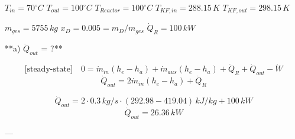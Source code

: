 \( T_{in} = 70^\circ C \)  
\( T_{out} = 100^\circ C \)  
\( T_{Reactor} = 100^\circ C \)  
\( T_{KF,in} = 288.15 \, K \)  
\( T_{KF,out} = 298.15 \, K \)  

\( m_{ges} = 5755 \, kg \)  
\( x_D = 0.005 = m_D / m_{ges} \)  
\( \dot{Q}_R = 100 \, kW \)  

**a) \( \dot{Q}_{out} \) = ?**  

\[ \text{[steady-state]} \quad 0 = \dot{m}_{in} (h_e - h_a) + \dot{m}_{aus} (h_e - h_a) + \dot{Q}_R + \dot{Q}_{out} - \dot{W} \]  
\[ \dot{Q}_{out} = 2 \dot{m}_{in} (h_e - h_a) + \dot{Q}_R \]  

\[ \dot{Q}_{out} = 2 \cdot 0.3 \, kg/s \cdot (292.98 - 419.04) \, kJ/kg + 100 \, kW \]  
\[ \dot{Q}_{out} = 26.36 \, kW \]  

---